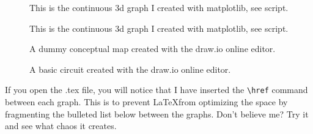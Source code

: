 \begin{figure}[!ht]
	\centering
	
	\caption{This is the continuous 3d graph I created with matplotlib, see script.}
	\label{graph:esempiograficopy2}
\end{figure}

\hfill

\begin{figure}[!ht]
	\centering
	
	\caption{This is the continuous 3d graph I created with matplotlib, see script.}
	\label{graph:esempiograficopy3}
\end{figure}

\hfill

\begin{figure}[!ht]
	\centering
	
	\caption{A dummy conceptual map created with the draw.io online editor.}
	\label{graph:esempioMappaConcettuale}
\end{figure}

\hfill

\begin{figure}[!ht]
	\centering
	
	\caption{A basic circuit created with the draw.io online editor.}
	\label{graph:esempioCircuito}
\end{figure}

\hfill

If you open the .tex file, you will notice that I have inserted the \texttt{\textbackslash href} command between each graph. This is to prevent \LaTeX from optimizing the space by fragmenting the bulleted list below between the graphs. Don’t believe me? Try it and see what chaos it creates.

